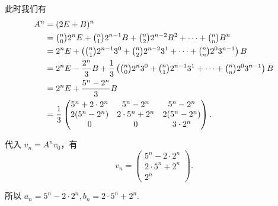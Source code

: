 \documentclass[12pt,fontset=fandol]{ctexart}
\begin{document}
\begin{solve}
            此时我们有
            \begin{align*}
                A^n &= (2E + B)^n \\
                    &= \tbinom{n}{0} 2^n E + \tbinom{n}{1} 2^{n-1} B + \tbinom{n}{2} 2^{n-2} B^2 + \cdots + \tbinom{n}{n} B^n \\
                    &= 2^n E + \left(\tbinom{n}{1} 2^{n-1} 3^0 + \tbinom{n}{2} 2^{n-2} 3^1 + \cdots + \tbinom{n}{n} 2^0 3^{n-1} \right) B \\
                    &= 2^n E - \frac{2^n}{3} B + \frac{1}{3} \left(\tbinom{n}{0} 2^n 3^0 + \tbinom{n}{1} 2^{n-1} 3^1 + \cdots + \tbinom{n}{n} 2^0 3^{n-1} \right) B \\
                    &= 2^n E + \frac{5^n - 2^n}{3} B \\
                    &= \frac{1}{3} \begin{pmatrix}
                        5^n + 2 \cdot 2^n & 5^n - 2^n         & 5^n - 2^n    \\
                        2(5^n - 2^n)      & 2 \cdot 5^n + 2^n & 2(5^n - 2^n) \\
                        0                 & 0                 & 3 \cdot 2^n
                    \end{pmatrix}.
            \end{align*}

            代入 $v_n = A^n v_0$，有
            \[
                v_n = \begin{pmatrix}
                    5^n - 2 \cdot 2^n \\
                    2 \cdot 5^n + 2^n \\
                    2^n
                \end{pmatrix}.
            \]

            所以 $a_n = 5^n - 2 \cdot 2^n, b_n = 2 \cdot 5^n + 2^n$.
\end{solve}
\end{document}

